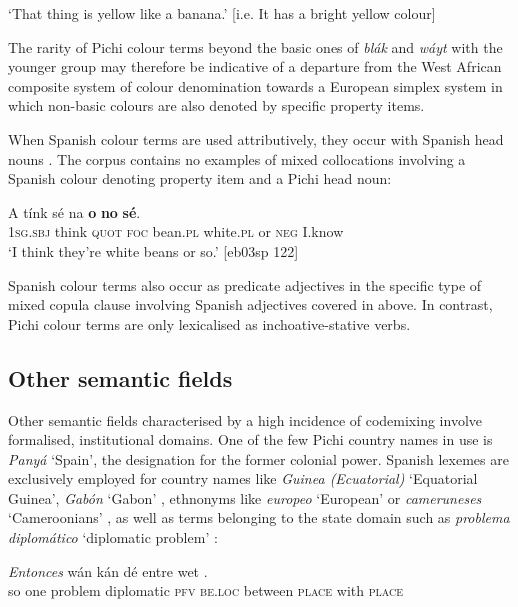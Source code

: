 \glt ‘That thing is yellow like a banana.’ [i.e. It has a bright yellow colour]
\z

The rarity of Pichi colour terms beyond the basic ones of \textit{blák} and \textit{wáyt} with the younger group may therefore be indicative of a departure from the West African composite system of colour denomination towards a European simplex system in which non-basic colours are also denoted by specific property items. 


When Spanish colour terms are used attributively, they occur with Spanish head nouns . The corpus contains no examples of mixed collocations involving a Spanish colour denoting property item and a Pichi head noun:



\ea%
    \label{ex:key:1753}
    \gll A    tínk    sé    na      \textbf{o}  \textbf{no}  \textbf{sé}.\\
\textsc{1sg.sbj}  think  \textsc{quot}    \textsc{foc}  bean.\textsc{pl}  white.\textsc{pl}  or  \textsc{neg}  I.know\\

\glt ‘I think they’re white beans or so.’ [eb03sp 122]
\z

Spanish colour terms also occur as predicate adjectives in the specific type of mixed copula clause involving Spanish adjectives covered in  above. In contrast, Pichi colour terms are only lexicalised as inchoative-stative verbs.	 

\subsection{Other semantic fields}

Other semantic fields characterised by a high incidence of codemixing involve formalised, institutional domains. One of the few Pichi country names in use is \textit{Panyá} ‘Spain’, the designation for the former colonial power. Spanish lexemes are exclusively employed for country names like \textit{Guinea (Ecuatorial)} ‘Equatorial Guinea’, \textit{Gabón} ‘Gabon’ , ethnonyms like \textit{europeo} ‘European’ or \textit{cameruneses} ‘Cameroonians’ , as well as terms belonging to the state domain such as \textit{problema diplomático} ‘diplomatic problem’ : 


\ea%
    \label{ex:key:1754}
    \gll \textit{Entonces}    wán        kán  dé    entre
  wet    .\\
so      one    problem    diplomatic  \textsc{pfv}  \textsc{be.loc}  between
\textsc{place}  with    \textsc{place}\\

